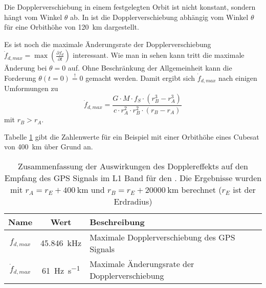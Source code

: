 
Die Dopplerverschiebung in einem festgelegten Orbit ist nicht konstant, sondern hängt vom Winkel $\theta$ ab. In  ist die Dopplerverschiebung abhängig vom Winkel $\theta$ für eine Orbithöhe von \SI{120}{\km} dargestellt. 


Es ist noch die maximale Änderungsrate der Dopplerverschiebung  $\dot f_{d,max}=\max\left(\frac{\partial f_d}{\partial t}\right)$ interessant.  Wie man in  sehen kann tritt die maximale Änderung bei $\theta=0$ auf. Ohne Beschränkung der Allgemeinheit kann die Forderung $\theta(t=0)\overset{!}{=}0$ gemacht werden. Damit ergibt sich $\dot f_{d,max}$ nach einigen Umformungen zu
\begin{equation}
	\dot f_{d,max}= \frac{G \cdot  M \cdot  f_S \cdot  (r_B^3-r_A^3)}{c \cdot  r_A^2 \cdot  r_B^2\cdot  (r_B-r_A)}
\end{equation}
mit $r_B>r_A$.

Tabelle \ref{TabDoppler} gibt die Zahlenwerte für ein Beispiel mit einer Orbithöhe eines Cubesat von \SI{400}{km} über Grund an.

\begin{table}[htbp]
    \ttabbox
    {
        \caption[Dopplereffekt für GPS Signal im \dscubesat]{Zusammenfassung der Auswirkungen des Dopplereffekts auf den Empfang des GPS Signals im L1 Band für den \dscubesat. Die Ergebnisse wurden mit $r_A=r_E+\SI{400}{\km}$ und $r_B=r_E+\SI{20000}{\km}$ berechnet ($r_E$ ist der Erdradius)}
        \label{TabDoppler}
    }
    {
    \begin{tabular}{c c p{5.5cm}}
        \toprule
        Name             & Wert & Beschreibung \\
        \midrule
        $f_{d,max}$ & \SI{45.846}{\kHz} &  Maximale Dopplerverschiebung des GPS Signals\\
        $\dot f_{d,max}$ & \SI{61}{\Hz\per\second}& Maximale Änderungsrate der Dopplerverschiebung \\
        \bottomrule
    \end{tabular}
}
\end{table}
